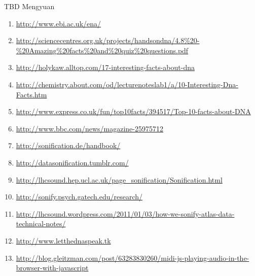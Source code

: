 \documentclass[12pt]{article}
\begin{document}
TBD Mengyuan

\printbibliography


\begin{enumerate}
	\item \url{http://www.ebi.ac.uk/ena/}
	\item \url{http://sciencecentres.org.uk/projects/handsondna/4.8%20-%20Amazing%20facts%20and%20quiz%20questions.pdf}
	\item \url{http://holykaw.alltop.com/17-interesting-facts-about-dna}
	\item \url{http://chemistry.about.com/od/lecturenoteslab1/a/10-Interesting-Dna-Facts.htm}
	\item \url{http://www.express.co.uk/fun/top10facts/394517/Top-10-facts-about-DNA}
	\item \url{http://www.bbc.com/news/magazine-25975712}
	\item \url{http://sonification.de/handbook/}
	\item \url{http://datasonification.tumblr.com/}
	\item \url{http://lhcsound.hep.ucl.ac.uk/page_sonification/Sonification.html}
	\item \url{http://sonify.psych.gatech.edu/research/}
	\item \url{http://lhcsound.wordpress.com/2011/01/03/how-we-sonify-atlas-data-technical-notes/}
	\item \url{http://www.letthednaspeak.tk}
	\item \url{http://blog.gleitzman.com/post/63283830260/midi-js-playing-audio-in-the-browser-with-javascript}

\end{enumerate}
\end{document}
